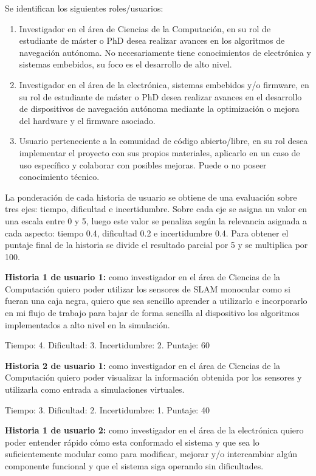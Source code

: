 \documentclass[
11pt, %
codirector, %
]{charter}
\begin{document}
Se identifican los siguientes roles/usuarios:
\begin{enumerate}
	\item Investigador en el área de Ciencias de la Computación, en su rol de estudiante de máster o PhD desea realizar avances en los algoritmos de navegación autónoma. No necesariamente tiene conocimientos de electrónica y sistemas embebidos, su foco es el desarrollo de alto nivel.
	\item Investigador en el área de la electrónica, sistemas embebidos y/o firmware, en su rol de estudiante de máster o PhD desea realizar avances en el desarrollo de dispositivos de navegación autónoma mediante la optimización o mejora del hardware y el firmware asociado.
	\item Usuario perteneciente a la comunidad de código abierto/libre, en su rol desea implementar el proyecto con sus propios materiales, aplicarlo en un caso de uso específico y colaborar con posibles mejoras. Puede o no poseer conocimiento técnico.
\end{enumerate}

La ponderación de cada historia de usuario se obtiene de una evaluación sobre tres ejes: tiempo, dificultad e incertidumbre. Sobre cada eje se asigna un valor en una escala entre 0 y 5, luego este valor se penaliza según la relevancia asignada a cada aspecto: tiempo 0.4, dificultad 0.2 e incertidumbre 0.4. Para obtener el puntaje final de la historia se divide el resultado parcial por 5 y se multiplica por 100.

\textbf{Historia 1 de usuario 1:} como investigador en el área de Ciencias de la Computación quiero poder utilizar los sensores de SLAM monocular como si fueran una caja negra, quiero que sea sencillo aprender a utilizarlo e incorporarlo en mi flujo de trabajo para bajar de forma sencilla al dispositivo los algoritmos implementados a alto nivel en la simulación.

Tiempo: 4. Dificultad: 3. Incertidumbre: 2. Puntaje: 60 

\textbf{Historia 2 de usuario 1:} como investigador en el área de Ciencias de la Computación quiero poder visualizar la información obtenida por los sensores y utilizarla como entrada a simulaciones virtuales.

Tiempo: 3. Dificultad: 2. Incertidumbre: 1. Puntaje: 40 

\textbf{Historia 1 de usuario 2:} como investigador en el área de la electrónica quiero poder entender rápido cómo esta conformado el sistema y que sea lo suficientemente modular como para modificar, mejorar y/o intercambiar algún componente funcional y que el sistema siga operando sin dificultades.
\end{document}
